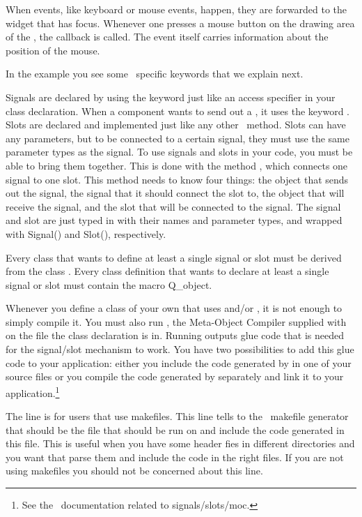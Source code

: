 When events, like keyboard or mouse events, happen, they
are forwarded to the widget that has focus.  Whenever one
presses a mouse button on the drawing area of the ,
the callback  is called.
The event itself carries information about the position of the mouse.

In the example you see some \qt\ specific keywords that we explain
next.

Signals are declared by using the keyword  just like an
access specifier in your class declaration. When a component wants to
send out a , it uses the keyword . Slots are
declared and implemented just like any other \CC\ method. Slots can
have any parameters, but to be connected to a certain signal, they
must use the same parameter types as the signal. To use signals and
slots in your code, you must be able to bring them together. This is
done with the method , which connects one
signal to one slot. This method needs to know four things: the object
that sends out the signal, the signal that it should connect the slot
to, the object that will receive the signal, and the slot that will be 
connected to the signal. The signal and slot are just typed in with
their names and parameter types, and wrapped with {\sc Signal()} and
{\sc Slot()}, respectively.

Every class that wants to define at least a single signal or slot must 
be derived from the class . Every class definition that
wants to declare at least a single signal or slot must contain the
macro {\sc Q\_object}.

Whenever you define a class of your own that uses  and/or
, it is not enough to simply compile it. You must also run
, the Meta-Object Compiler supplied with \qt\, on the file
the class declaration is in. Running  outputs glue code that
is needed for the signal/slot mechanism to work. You have two
possibilities to add this glue code to your application: either you
include the code generated by  in one of your source files or 
you compile the code generated by  separately and link it to your
application.\footnote{See the \qt\ documentation related to signals/slots/moc.}

The line  is for users that use
makefiles. This line tells to the \cgal\ makefile generator that
 should be the file that  should be run on
and include the code generated in this file. This is useful when you
have some header fies in different directories and you want that
 parse them and include the code in the right files. If you
are not using makefiles you should not be concerned about this line.

